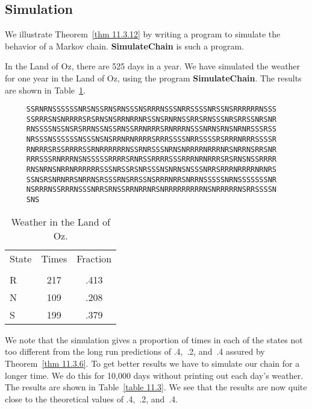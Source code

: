 \subsection*{Simulation}
We illustrate Theorem~\ref{thm 11.3.12} by writing a program to simulate the
behavior of a
Markov chain.  {\bf  SimulateChain} is such a program.  

\begin{example}\label{exam 11.3.2.6}
In the Land of Oz, there are 525 days in a year.
  We have simulated the weather for one year in
the Land of Oz, using the program {\bf SimulateChain}.  The results are shown
in 
Table~\ref{table 11.2}. 

\begin{table}[h]
\centering
\begin{verbatim}
     SSRNRNSSSSSSNRSNSSRNSRNSSSNSRRRNSSSNRRSSSSNRSSNSRRRRRRNSSS 
     SSRRRSNSNRRRRSRSRNSNSRRNRRNRSSNSRNRNSSRRSRNSSSNRSRRSSNRSNR
     RNSSSSNSSNSRSRRNSSNSSRNSSRRNRRRSRNRRRNSSSNRNSRNSNRNRSSSRSS
     NRSSSNSSSSSSNSSSNSNSRRNRNRRRRSRRRSSSSNRRSSSSRSRRRNRRRSSSSR
     RNRRRSRSSRRRRSSRNRRRRRRNSSRNRSSSNRNSNRRRRNRRRNRSNRRNSRRSNR
     RRRSSSRNRRRNSNSSSSSRRRRSRNRSSRRRRSSSRRRNRNRRRSRSRNSNSSRRRR
     RNSNRNSNRRNRRRRRRSSSNRSSRSNRSSSNSNRNSNSSSNRRSRRRNRRRRNRNRS
     SSNSRSNRNRRSNRRNSRSSSRNSRRSSNSRRRNRRSNRRNSSSSSNRNSSSSSSSNR
     NSRRRNSSRRRNSSSNRRSRNSSRRNRRNRSNRRRRRRRRRNSNRRRRRNSRRSSSSN
     SNS
\end{verbatim}
\begin{tabular}{lcc}
State    &      Times     &      Fraction\\
         &                &           \\
R        &        217     &      .413 \\
N        &        109     &      .208 \\
S        &        199     &      .379 \\
\end{tabular}
\caption{Weather in the Land of Oz.}
\label{table 11.2}
\end{table}
 
We note that the simulation gives a proportion of times in each of the states
not too different from the long run predictions of .4,~.2, and~.4 assured by
Theorem~\ref{thm 11.3.6}.  To get better results we have to simulate our chain 
for a longer time.  We do this for 10{,}000 days without printing out each
day's
weather.  The results are shown in Table~\ref{table 11.3}.  We see that the
results are 
now quite close to the theoretical values
of .4,~.2, and~.4.


\end{example}
